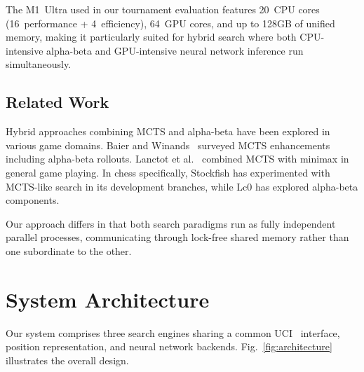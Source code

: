 \documentclass{svproc}
\begin{document}
The M1~Ultra used in our tournament evaluation features 20~CPU cores (16~performance + 4~efficiency), 64~GPU cores, and up to 128GB of unified memory, making it particularly suited for hybrid search where both CPU-intensive alpha-beta and GPU-intensive neural network inference run simultaneously.

\subsection{Related Work}
\label{sec:bg-related}

Hybrid approaches combining MCTS and alpha-beta have been explored in various game domains. Baier and Winands~\cite{baier2015mcts} surveyed MCTS enhancements including alpha-beta rollouts. Lanctot et al.~\cite{lanctot2014monte} combined MCTS with minimax in general game playing. In chess specifically, Stockfish has experimented with MCTS-like search in its development branches, while Lc0 has explored alpha-beta components.

Our approach differs in that both search paradigms run as fully independent parallel processes, communicating through lock-free shared memory rather than one subordinate to the other.



\FloatBarrier
\section{System Architecture}
\label{sec:architecture}

Our system comprises three search engines sharing a common UCI~\cite{uci} interface, position representation, and neural network backends. Fig.~\ref{fig:architecture} illustrates the overall design.
\end{document}
